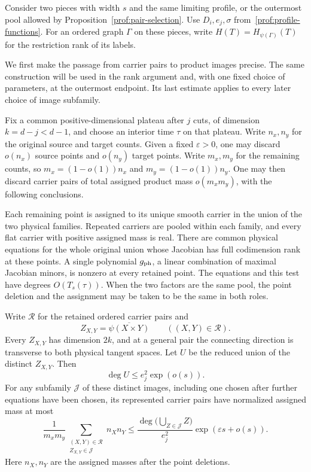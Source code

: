 Consider two pieces with width $s$ and the same limiting profile,
or the outermost pool allowed by Proposition~\ref{prof:pair-selection}.
Use $D_i,e_j,\sigma$ from~\eqref{prof:profile-functions}.
For an ordered graph $\Gamma$ on these pieces, write
$H(T)=H_{\psi(\Gamma)}(T)$ for the restriction rank of its labels.

We first make the passage from carrier pairs to product images precise.
The same construction will be used in the rank argument and, with one
fixed choice of parameters, at the outermost endpoint.  Its last estimate
applies to every later choice of image subfamily.

\begin{lemma}
\label{sc:retained-products}
Fix a common positive-dimensional plateau after $j$ cuts, of dimension
$k=d-j<d-1$, and choose an interior time $\tau$ on that plateau.  Write
$n_x,n_y$ for the original source and target counts.  Given a fixed
$\varepsilon>0$, one may discard $o(n_x)$ source points and
$o(n_y)$ target points.  Write $m_x,m_y$ for the remaining counts, so
$m_x=(1-o(1))n_x$ and $m_y=(1-o(1))n_y$.  One may then discard carrier
pairs of total assigned product mass $o(m_xm_y)$, with the following conclusions.

Each remaining point is assigned to its unique smooth carrier in the
union of the two physical families.  Repeated carriers are pooled within
each family, and every flat carrier with positive assigned mass is real.
There are common physical equations for the whole original union whose Jacobian
has full codimension rank at these points.  A single polynomial
$g_{\rm ph}$, a linear combination of maximal Jacobian minors, is nonzero
at every retained point.  The equations and this test have degrees
$O(T_s(\tau))$.
When the two factors are the same pool, the point deletion and the
assignment may be taken to be the same in both roles.

Write $\mathcal R$ for the retained ordered carrier pairs and
\[
 Z_{X,Y}=\overline{\psi(X\times Y)}\qquad((X,Y)\in\mathcal R).
\]
Every $Z_{X,Y}$ has dimension $2k$, and at a general pair the connecting
direction is transverse to both physical tangent spaces.  Let $U$ be the
reduced union of the distinct $Z_{X,Y}$.  Then
\begin{equation}\label{sc:retained-image-upper}
 \deg U\le e_j^2\exp(o(s)).
\end{equation}
For any subfamily $\mathcal J$ of these distinct images, including one
chosen after further equations have been chosen, its represented carrier
pairs have normalized assigned mass at most
\begin{equation}\label{sc:retained-image-mass}
 \frac{1}{m_xm_y}
 \sum_{\substack{(X,Y)\in\mathcal R\\Z_{X,Y}\in\mathcal J}}n_Xn_Y
 \le \frac{\deg\bigl(\bigcup_{Z\in\mathcal J}Z\bigr)}{e_j^2}
       \exp(\varepsilon s+o(s)).
\end{equation}
Here $n_X,n_Y$ are the assigned masses after the point deletions.
\end{lemma}

